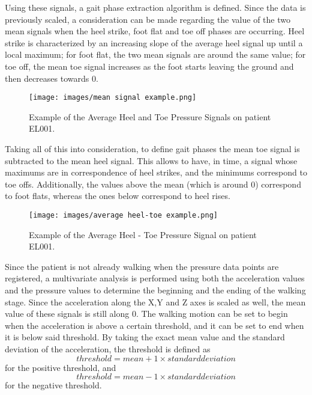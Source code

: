 Using these signals, a gait phase extraction algorithm is defined. Since the data is previously scaled, a consideration can be made regarding the value of the two mean signals when the heel strike, foot flat and toe off phases are occurring.
Heel strike is characterized by an increasing slope of the average heel signal up until a local maximum; for foot flat, the two mean signals are around the same value; for toe off, the mean toe signal increases as the foot starts leaving the ground and then decreases towards 0.
\begin{figure}[ht!]
    \centering
    \texttt{[image: images/mean signal example.png]}
    \caption{Example of the Average Heel and Toe Pressure Signals on patient EL001.}
    \label{fig:Example of the Average Heel and Toe Pressure Signals on patient EL001.}
\end{figure}

Taking all of this into consideration, to define gait phases the mean toe signal is subtracted to the mean heel signal. This allows to have, in time, a signal whose maximums are in correspondence of heel strikes, and the minimums correspond to toe offs. Additionally, the values above the mean (which is around 0) correspond to foot flats, whereas the ones below correspond to heel rises. 

\begin{figure}[ht!]
    \centering
    \texttt{[image: images/average heel-toe example.png]}
    \caption{Example of the Average Heel - Toe Pressure Signal on patient EL001.}
    \label{fig:Example of the Average Heel - Toe Pressure Signal on patient EL001.}
\end{figure}

Since the patient is not already walking when the pressure data points are registered, a multivariate analysis is performed using both the acceleration values and the pressure values to determine the beginning and the ending of the walking stage. 
Since the acceleration along the X,Y and Z axes is scaled as well, the mean value of these signals is still along 0. 
The walking motion can be set to begin when the acceleration is above a certain threshold, and it can be set to end when it is below said threshold. By taking the exact mean value and the standard deviation of the acceleration, the threshold is defined as
\begin{equation}
    threshold = mean + 1 \times standard deviation
\end{equation}
for the positive threshold, and
\begin{equation}
    threshold = mean - 1 \times standard deviation
\end{equation}
for the negative threshold.

